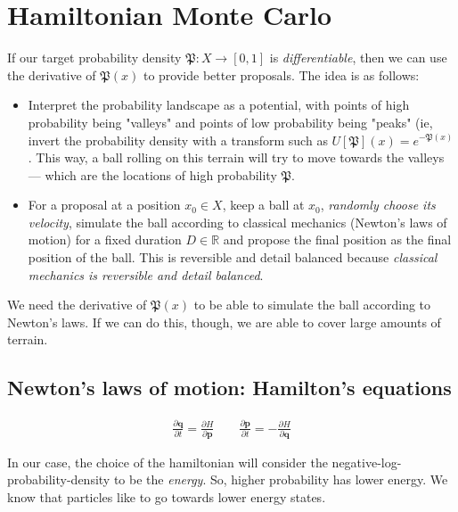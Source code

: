 \documentclass[titlepage]{article}
\newcommand{\R}{\mathbb{R}}
\newcommand{\p}{\mathbf{p}}
\newcommand{\q}{\mathbf{q}}
\renewcommand{\P}{\mathfrak{P}}
\begin{document}
\section{Hamiltonian Monte Carlo}

If our target probability density $\P: X \rightarrow [0, 1]$ is \emph{differentiable},
then we can use the derivative of $\P(x)$ to provide better proposals. The idea
is as follows:

\begin{itemize}
    \item Interpret the probability landscape as a potential, with
        points of high probability being "valleys" and points of low probability
        being "peaks" (ie, invert the probability density with a transform
        such as $U[\P](x) = e^{-\P(x)}$. This way, a ball rolling on this
        terrain will try to move towards the valleys --- which are the locations
        of high probability $\P$.
    \item For a proposal at a position $x_0 \in X$, keep a ball at $x_0$,
        \emph{randomly choose its velocity}, simulate the ball according to 
        classical mechanics (Newton's laws of motion) for a fixed duration $D \in \R$
        and propose the final position as the final position of the ball. This
        is reversible and detail balanced because 
        \emph{classical mechanics is reversible and detail balanced}.
\end{itemize}
We need the derivative of $\P(x)$ to be able to simulate the ball according
to Newton's laws. If we can do this, though, we are able to cover large
amounts of terrain.


\subsection{Newton's laws of motion: Hamilton's equations}

\begin{align*}
    \frac{\partial \q}{\partial t} = \frac{\partial H}{\partial \p} \qquad
    \frac{\partial \p}{\partial t} = - \frac{\partial H}{\partial \q}
\end{align*}

In our case, the choice of the hamiltonian will consider the negative-log-probability-density
to be the \emph{energy}. So, higher probability has lower energy. We know that
particles like to go towards lower energy states.
\end{document}
